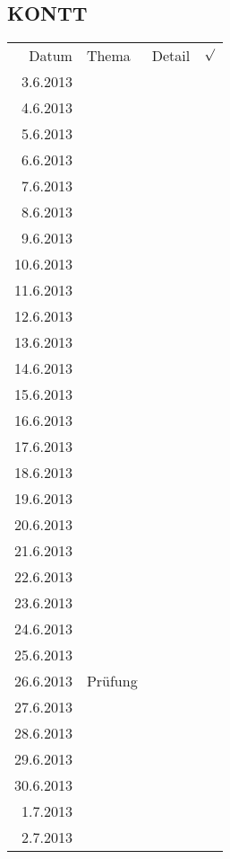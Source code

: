 \subsection{KONTT}
\begin{tabular}{r l p{} l}
\rowcolor{lgray} Datum     & Thema         & Detail & $\surd$ \\
\rowcolor{white}  3.6.2013 &               &  &  \\
\rowcolor{lgray}  4.6.2013 &               &  &  \\
\rowcolor{white}  5.6.2013 &               &  &  \\
\rowcolor{lgray}  6.6.2013 &               &  &  \\
\rowcolor{white}  7.6.2013 &               &  &  \\
\rowcolor{lgray}  8.6.2013 &               &  &  \\
\rowcolor{white}  9.6.2013 &               &  &  \\
\rowcolor{lgray} 10.6.2013 &               &  &  \\
\rowcolor{white} 11.6.2013 &               &  &  \\
\rowcolor{lgray} 12.6.2013 &               &  &  \\
\rowcolor{white} 13.6.2013 &               &  &  \\
\rowcolor{lgray} 14.6.2013 &               &  &  \\
\rowcolor{white} 15.6.2013 &               &  &  \\
\rowcolor{lgray} 16.6.2013 &               &  &  \\
\rowcolor{white} 17.6.2013 &               &  &  \\
\rowcolor{lgray} 18.6.2013 &               &  &  \\
\rowcolor{white} 19.6.2013 &               &  &  \\
\rowcolor{lgray} 20.6.2013 &               &  &  \\
\rowcolor{white} 21.6.2013 &               &  &  \\
\rowcolor{lgray} 22.6.2013 &               &  &  \\
\rowcolor{white} 23.6.2013 &               &  &  \\
\rowcolor{lgray} 24.6.2013 &               &  &  \\
\rowcolor{white} 25.6.2013 &               &  &  \\
\rowcolor{lgray} 26.6.2013 & Prüfung       &  &  \\
\rowcolor{white} 27.6.2013 &               &  &  \\
\rowcolor{lgray} 28.6.2013 &               &  &  \\
\rowcolor{white} 29.6.2013 &               &  &  \\
\rowcolor{lgray} 30.6.2013 &               &  &  \\
\rowcolor{white}  1.7.2013 &               &  &  \\
\rowcolor{lgray}  2.7.2013 &               &  &  \\
\end{tabular}

